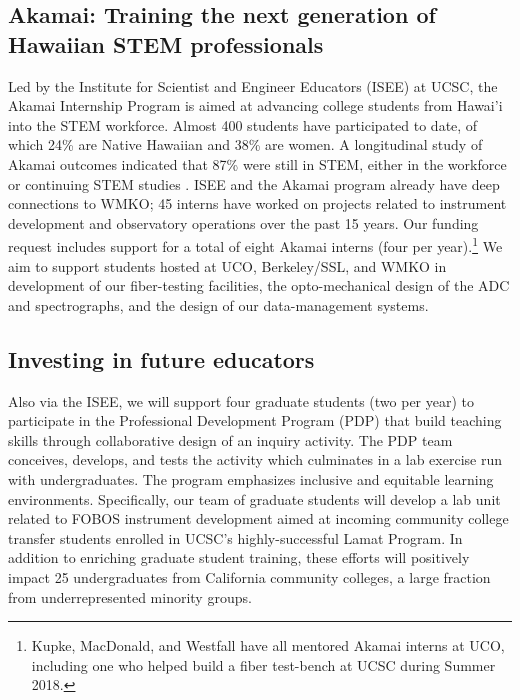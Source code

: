\documentclass[oneside,11pt]{amsart}
\begin{document}
\subsection{Akamai: Training the next generation of Hawaiian STEM
professionals} Led by the Institute for Scientist and Engineer
Educators (ISEE) at UCSC, the Akamai Internship Program is aimed at
advancing college students from Hawai'i into the STEM workforce.
Almost 400 students have participated to date, of which 24\% are
Native Hawaiian and 38\% are women. A longitudinal study of Akamai
outcomes indicated that 87\% were still in STEM, either in the
workforce or continuing STEM studies \citep{asee_peer_31030}. ISEE
and the Akamai program already have deep connections to WMKO; 45
interns have worked on projects related to instrument development and
observatory operations over the past 15 years. Our funding request
includes support for a total of eight Akamai interns (four per
year).\footnote{
%
Kupke, MacDonald, and Westfall have all mentored Akamai interns at
UCO, including one who helped build a fiber test-bench at UCSC during
Summer 2018.} We aim to support students hosted at UCO, Berkeley/SSL,
and WMKO in development of our fiber-testing facilities, the
opto-mechanical design of the ADC and spectrographs, and the design
of our data-management systems.


\subsection{Investing in future educators} Also via the ISEE, we will
support four graduate students (two per year) to participate in the
Professional Development Program (PDP) that build teaching skills
through collaborative design of an inquiry activity. The PDP team
conceives, develops, and tests the activity which culminates in a lab
exercise run with undergraduates. The program emphasizes inclusive
and equitable learning environments. Specifically, our team of
graduate students will develop a lab unit related to FOBOS instrument
development aimed at incoming community college transfer students
enrolled in UCSC's highly-successful Lamat Program. In addition to
enriching graduate student training, these efforts will positively
impact 25 undergraduates from California community colleges, a large
fraction from underrepresented minority groups.
\end{document}
